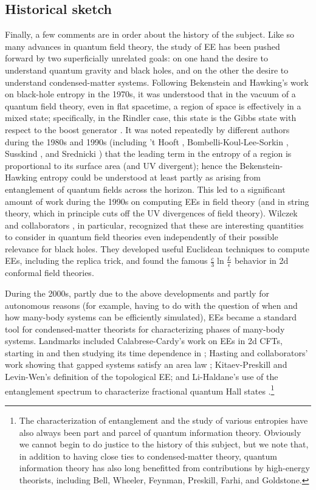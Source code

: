\documentclass[11pt]{article}
\begin{document}
\subsection{Historical sketch}

Finally, a few comments are in order about the history of the subject. Like so many advances in quantum field theory, the study of EE has been pushed forward by two superficially unrelated goals: on one hand the desire to understand quantum gravity and black holes, and on the other the desire to understand condensed-matter systems. Following Bekenstein and Hawking's work on black-hole entropy in the 1970s, it was understood that in the vacuum of a quantum field theory, even in flat spacetime, a region of space is effectively in a mixed state; specifically, in the Rindler case, this state is the Gibbs state with respect to the boost generator \cite{PhysRevD.14.870,Bisognano:1976za}. It was noted repeatedly by different authors during the 1980s and 1990s (including 't Hooft \cite{tHooft:1984kcu}, Bombelli-Koul-Lee-Sorkin \cite{Bombelli:1986rw}, Susskind \cite{Susskind:1993ws}, and Srednicki \cite{Srednicki:1993im}) that the leading term in the entropy of a region is proportional to its surface area (and UV divergent); hence the Bekenstein-Hawking entropy could be understood at least partly as arising from entanglement of quantum fields across the horizon. This led to a significant amount of work during the 1990s on computing EEs in field theory (and in string theory, which in principle cuts off the UV divergences of field theory). Wilczek and collaborators \cite{Callan:1994py,Holzhey:1994we}, in particular, recognized that these are interesting quantities to consider in quantum field theories even independently of their possible relevance for black holes. They developed useful Euclidean techniques to compute EEs, including the replica trick, and found the famous $\frac c3\ln\frac L\epsilon$ behavior in 2d conformal field theories.

During the 2000s, partly due to the above developments and partly for autonomous reasons (for example, having to do with the question of when and how many-body systems can be efficiently simulated), EEs became a standard tool for condensed-matter theorists for characterizing phases of many-body systems. Landmarks included Calabrese-Cardy's work on EEs in 2d CFTs, starting in \cite{Calabrese:2004eu} and then studying its time dependence in \cite{Calabrese:2005in}; Hasting and collaborators' work showing that gapped systems satisfy an area law \cite{2006PhRvB..73h5115H,Wolf:2007tdq}; Kitaev-Preskill \cite{Kitaev:2005dm} and Levin-Wen's \cite{2006PhRvL..96k0405L} definition of the topological EE; and Li-Haldane's use of the entanglement spectrum to characterize fractional quantum Hall states \cite{2008PhRvL.101a0504L}.\footnote{The characterization of entanglement and the study of various entropies have also always been part and parcel of quantum information theory. Obviously we cannot begin to do justice to the history of this subject, but we note that, in addition to having close ties to condensed-matter theory, quantum information theory has also long benefitted from contributions by high-energy theorists, including Bell, Wheeler, Feynman, Preskill, Farhi, and Goldstone.}
\end{document}
